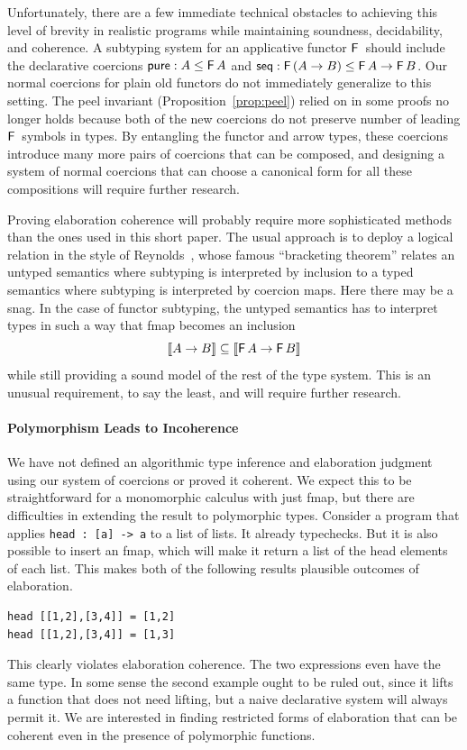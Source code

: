 \documentclass[acmsmall,screen]{acmart}
\begin{document}
Unfortunately, there are a few immediate technical obstacles to achieving this
level of brevity in realistic programs while maintaining soundness,
decidability, and coherence.
A subtyping system for an applicative functor \(\mathsf{F}\,\) should include the
declarative coercions \(\textsf{pure} : A \leq \mathsf{F}\, A\) and \(\textsf{seq}
: \mathsf{F}\,(A \to B) \leq \mathsf{F}\, A \to \mathsf{F}\, B\). Our normal coercions for plain old
functors do not immediately generalize to this setting. The peel invariant
(Proposition~\ref{prop:peel}) relied on in some proofs no longer holds because
both of the new coercions do not preserve number of leading \(\mathsf{F}\,\) symbols in
types. By entangling the functor and arrow types, these coercions introduce many
more
pairs of coercions that can be composed, and designing a system of normal
coercions that can choose a canonical form for all these compositions will
require further research.

Proving elaboration coherence will probably require more sophisticated methods
than the ones used in this short paper. The usual approach is to deploy
a logical relation in the style of Reynolds~\cite{reynolds00}, whose famous
``bracketing theorem'' relates an untyped semantics where subtyping is
interpreted by inclusion to a typed semantics where subtyping is interpreted by
coercion maps. Here there may be a snag. In the case of functor subtyping, the
untyped semantics has to interpret types in such a way that fmap becomes an
inclusion \[ \llbracket A \to B \rrbracket \subseteq \llbracket \mathsf{F}\, A \to \mathsf{F}\,
B \rrbracket \] while still providing a sound model of the rest of the type
system. This is an unusual requirement, to say the least, and will require
further research.


\paragraph{Polymorphism Leads to Incoherence}
We have not defined an algorithmic type inference and elaboration judgment using
our system of coercions or proved it coherent. We expect this to be
straightforward for a monomorphic calculus with just fmap, but there are
difficulties in extending the result to polymorphic types.  Consider a program
that applies \texttt{head : [a] -> a} to a list of lists. It already typechecks.
But it is also possible to insert an fmap, which will make it return a list of
the head elements of each list. This makes both of the following results
plausible outcomes of elaboration.
\begin{Verbatim}
head [[1,2],[3,4]] = [1,2]
head [[1,2],[3,4]] = [1,3]
\end{Verbatim}
This clearly violates elaboration coherence. The two expressions even have the
same type. In some sense the second example ought to be ruled out, since it
lifts a function that does not need lifting, but a naive declarative system will
always permit it. We are interested in finding restricted forms of elaboration
that can be coherent even in the presence of polymorphic functions.
\end{document}
